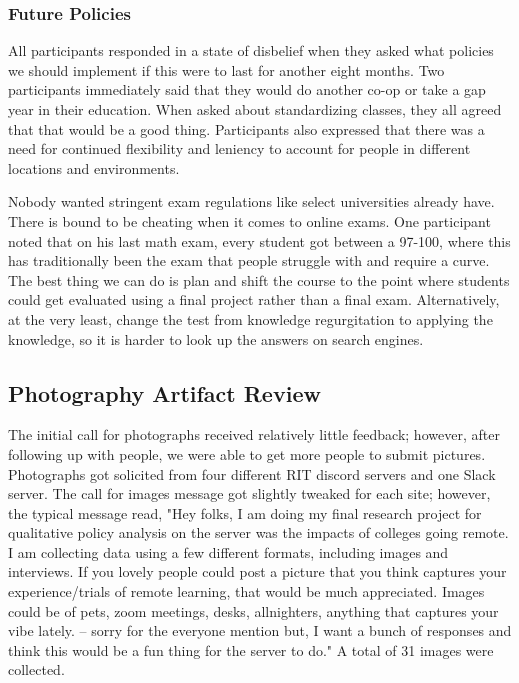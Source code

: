 \documentclass[12pt,
 reprint,
nofootinbib,
 amsmath,amssymb,
 aps,
floatfix,
]{revtex4-2}
\begin{document}
\subsubsection{Future Policies}


All participants responded in a state of disbelief when they asked what policies we should implement if this were to last for another eight months. Two participants immediately said that they would do another co-op or take a gap year in their education. When asked about standardizing classes, they all agreed that that would be a good thing. Participants also expressed that there was a need for continued flexibility and leniency to account for people in different locations and environments.

Nobody wanted stringent exam regulations like select universities already have\cite{webCam}. There is bound to be cheating when it comes to online exams. One participant noted that on his last math exam, every student got between a 97-100, where this has traditionally been the exam that people struggle with and require a curve. The best thing we can do is plan and shift the course to the point where students could get evaluated using a final project rather than a final exam. Alternatively, at the very least, change the test from knowledge regurgitation to applying the knowledge, so it is harder to look up the answers on search engines. 


\subsection{Photography Artifact Review}

The initial call for photographs received relatively little feedback; however, after following up with people, we were able to get more people to submit pictures. Photographs got solicited from four different RIT discord servers and one Slack server. The call for images message got slightly tweaked for each site; however, the typical message read, "Hey folks, I am doing my final research project for qualitative policy analysis on the server was the impacts of colleges going remote. I am collecting data using a few different formats, including images and interviews. If you lovely people could post a picture that you think captures your experience/trials of remote learning, that would be much appreciated. Images could be of pets, zoom meetings, desks, allnighters, anything that captures your vibe lately. -- sorry for the everyone mention but, I want a bunch of responses and think this would be a fun thing for the server to do." A total of 31 images were collected.
\end{document}
